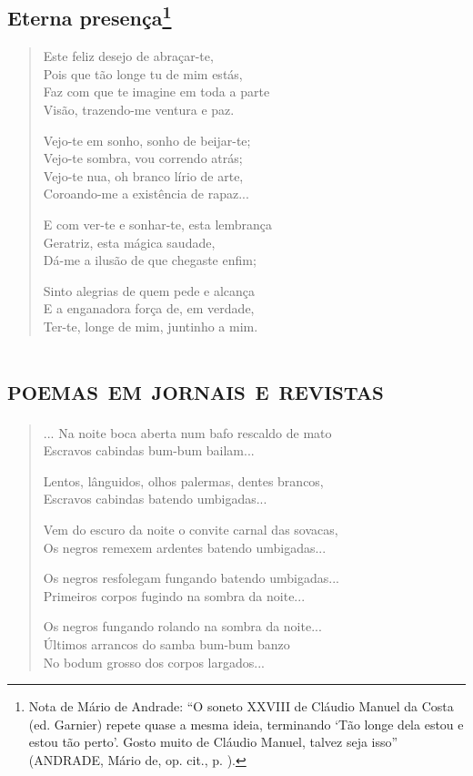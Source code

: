 \chapter{Eterna presença\footnote[*]{Nota de Mário de Andrade: ``O soneto
  XXVIII de Cláudio Manuel da Costa (ed. Garnier) repete quase a mesma
  ideia, terminando `Tão longe dela estou e estou tão perto'. Gosto
  muito de Cláudio Manuel, talvez seja isso'' (ANDRADE, Mário de, op.
  cit., p. ).}}

\begin{verse}
Este feliz desejo de abraçar-te,\\
Pois que tão longe tu de mim estás,\\
Faz com que te imagine em toda a parte\\
Visão, trazendo-me ventura e paz.

Vejo-te em sonho, sonho de beijar-te;\\
Vejo-te sombra, vou correndo atrás;\\
Vejo-te nua, oh branco lírio de arte,\\
Coroando-me a existência de rapaz...

E com ver-te e sonhar-te, esta lembrança\\
Geratriz, esta mágica saudade,\\
Dá-me a ilusão de que chegaste enfim;

Sinto alegrias de quem pede e alcança\\
E a enganadora força de, em verdade,\\
Ter-te, longe de mim, juntinho a mim.
\end{verse}

\part{\textsc{poemas em jornais e revistas}}



\begin{verse}
... Na noite boca aberta num bafo rescaldo de mato\\
Escravos cabindas bum-bum bailam...

Lentos, lânguidos, olhos palermas, dentes brancos,\\
Escravos cabindas batendo umbigadas...

Vem do escuro da noite o convite carnal das sovacas,\\
Os negros remexem ardentes batendo umbigadas...

Os negros resfolegam fungando batendo umbigadas...\\
Primeiros corpos fugindo na sombra da noite...

Os negros fungando rolando na sombra da noite...\\
Últimos arrancos do samba bum-bum banzo\\
No bodum grosso dos corpos largados...
\end{verse}

